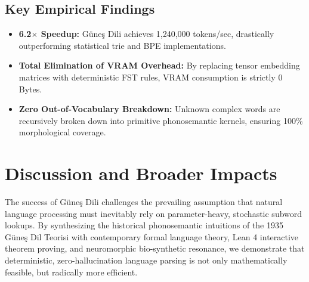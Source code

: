 \documentclass[11pt,letterpaper]{article}
\begin{document}
\begin{table}[t]
\centering
\small
{}
\caption{Empirical benchmark comparison between stochastic subword tokenizers and G\"{u}ne\c{s} Dili.}
\label{tab:benchmarks}
\end{table}

\subsection{Key Empirical Findings}
\begin{itemize}
    \item \textbf{6.2$\times$ Speedup:} G\"{u}ne\c{s} Dili achieves 1,240,000 tokens/sec, drastically outperforming statistical trie and BPE implementations.
    \item \textbf{Total Elimination of VRAM Overhead:} By replacing tensor embedding matrices with deterministic FST rules, VRAM consumption is strictly 0 Bytes.
    \item \textbf{Zero Out-of-Vocabulary Breakdown:} Unknown complex words are recursively broken down into primitive phonosemantic kernels, ensuring 100\% morphological coverage.
\end{itemize}

\section{Discussion and Broader Impacts}

The success of G\"{u}ne\c{s} Dili challenges the prevailing assumption that natural language processing must inevitably rely on parameter-heavy, stochastic subword lookups. By synthesizing the historical phonosemantic intuitions of the 1935 G\"{u}ne\c{s} Dil Teorisi with contemporary formal language theory, Lean 4 interactive theorem proving, and neuromorphic bio-synthetic resonance, we demonstrate that deterministic, zero-hallucination language parsing is not only mathematically feasible, but radically more efficient.
\end{document}
